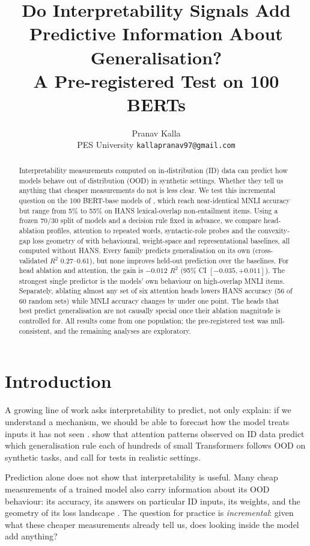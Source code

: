 \documentclass[10pt]{article}
\title{Do Interpretability Signals Add Predictive Information About Generalisation?\\
A Pre-registered Test on 100 BERTs}
\author{Pranav Kalla\\[2pt]\small PES University \quad \texttt{kallapranav97@gmail.com}}
\date{}
\begin{document}
\maketitle

\begin{abstract}
\noindent Interpretability measurements computed on in-distribution (ID) data can predict how models behave out of distribution (OOD) in synthetic settings. Whether they tell us anything that cheaper measurements do not is less clear. We test this incremental question on the 100 BERT-base models of \citet{mccoy2020}, which reach near-identical MNLI accuracy but range from 5\% to 55\% on HANS lexical-overlap non-entailment items. Using a frozen 70/30 split of models and a decision rule fixed in advance, we compare head-ablation profiles, attention to repeated words, syntactic-role probes and the convexity-gap loss geometry of \citet{juneja2023} with behavioural, weight-space and representational baselines, all computed without HANS. Every family predicts generalisation on its own (cross-validated $R^2$ 0.27--0.61), but none improves held-out prediction over the baselines. For head ablation and attention, the gain is $-0.012$ $R^2$ (95\% CI $[-0.035, +0.011]$). The strongest single predictor is the models' own behaviour on high-overlap MNLI items. Separately, ablating almost any set of six attention heads lowers HANS accuracy (56 of 60 random sets) while MNLI accuracy changes by under one point. The heads that best predict generalisation are not causally special once their ablation magnitude is controlled for. All results come from one population; the pre-registered test was null-consistent, and the remaining analyses are exploratory.
\end{abstract}

\section{Introduction}
A growing line of work asks interpretability to predict, not only explain: if we understand a mechanism, we should be able to forecast how the model treats inputs it has not seen \citep{li2025,position2026}. \citet{li2025} show that attention patterns observed on ID data predict which generalisation rule each of hundreds of small Transformers follows OOD on synthetic tasks, and call for tests in realistic settings.

Prediction alone does not show that interpretability is useful. Many cheap measurements of a trained model also carry information about its OOD behaviour: its accuracy, its answers on particular ID inputs, its weights, and the geometry of its loss landscape \citep{juneja2023,ding2021}. The question for practice is \emph{incremental}: given what these cheaper measurements already tell us, does looking inside the model add anything?
\end{document}
